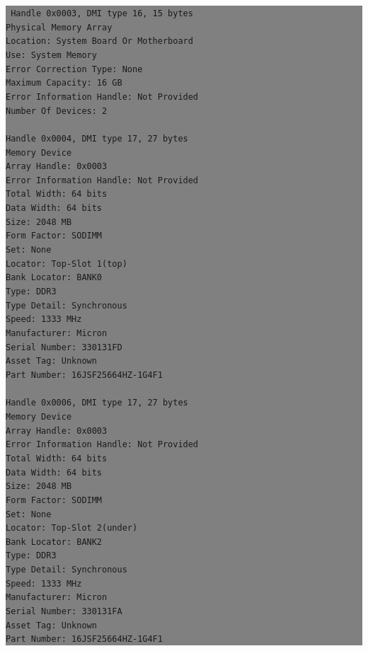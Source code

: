 \documentclass[12pt]{article}
\begin{document}
\colorbox{grey}{\parbox[t]{0.95\linewidth}{ \vspace*{0.5cm} { 
{\tt
Handle 0x0003, DMI type 16, 15 bytes\\
Physical Memory Array\\
	Location: System Board Or Motherboard\\
	Use: System Memory\\
	Error Correction Type: None\\
	Maximum Capacity: 16 GB\\
	Error Information Handle: Not Provided\\
	Number Of Devices: 2\\
\\
Handle 0x0004, DMI type 17, 27 bytes\\
Memory Device\\
	Array Handle: 0x0003\\
	Error Information Handle: Not Provided\\
	Total Width: 64 bits\\
	Data Width: 64 bits\\
	Size: 2048 MB\\
	Form Factor: SODIMM\\
	Set: None\\
	Locator: Top-Slot 1(top)\\
	Bank Locator: BANK0\\
	Type: DDR3\\
	Type Detail: Synchronous\\
	Speed: 1333 MHz\\
	Manufacturer: Micron\\
	Serial Number: 330131FD\\
	Asset Tag: Unknown\\
	Part Number: 16JSF25664HZ-1G4F1\\
\\
Handle 0x0006, DMI type 17, 27 bytes\\
Memory Device\\
	Array Handle: 0x0003\\
	Error Information Handle: Not Provided\\
	Total Width: 64 bits\\
	Data Width: 64 bits\\
	Size: 2048 MB\\
	Form Factor: SODIMM\\
	Set: None\\
	Locator: Top-Slot 2(under)\\
	Bank Locator: BANK2\\
	Type: DDR3\\
	Type Detail: Synchronous\\
	Speed: 1333 MHz\\
	Manufacturer: Micron\\
	Serial Number: 330131FA\\
	Asset Tag: Unknown\\
	Part Number: 16JSF25664HZ-1G4F1\\
}
} \vspace*{0.5cm} } } 
\end{document}
